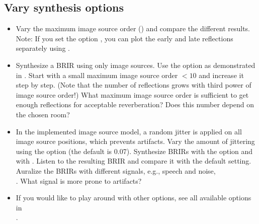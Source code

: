 \documentclass[a4paper, fleqn, 11pt]{article}
\begin{document}
\subsection{Vary synthesis options}
\label{task:op}
\begin{itemize}
  \item Vary the maximum image source order () and compare the different results. Note: If you set the option , you can plot the early and late reflections separately using .
  
  \item Synthesize a BRIR using only image sources. Use the option  as demonstrated in . Start with a small maximum image source order $< 10$ and increase it step by step. (Note that the number of reflections grows with third power of image source order!) What maximum image source order is sufficient to get enough reflections for acceptable reverberation? Does this number depend on the chosen room?
  
  \item In the implemented image source model, a random jitter is applied on all image source positions, which prevents  artifacts. Vary the amount of jittering using the option  (the default is 0.07). Synthesize BRIRs with the  option and with . Listen to the resulting BRIR and compare it with the default setting. Auralize the BRIRs with different signals, e.g., speech and noise,\\
  . What signal is more prone to artifacts?
  
  \item If you would like to play around with other options, see all available options in\\
  .
\end{itemize}

\end{document}
